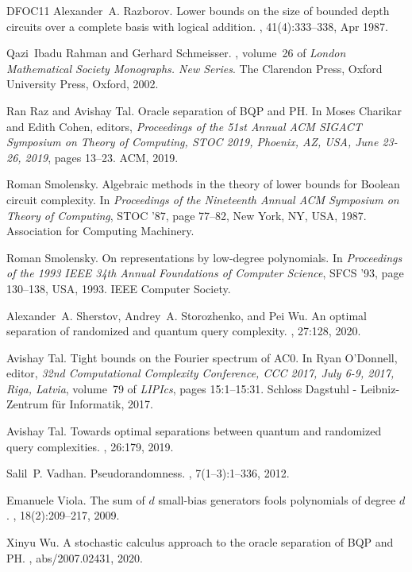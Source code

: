 \documentclass[10pt,a4paper]{article}
\theoremstyle{definition}
\begin{document}
\begin{thebibliography}{DFOC{\etalchar{+}}11}
Alexander~A. Razborov.
\newblock Lower bounds on the size of bounded depth circuits over a complete
  basis with logical addition.
,
  41(4):333--338, Apr 1987.

Qazi~Ibadu Rahman and Gerhard Schmeisser.
, volume~26 of {\em London
  Mathematical Society Monographs. New Series}.
\newblock The Clarendon Press, Oxford University Press, Oxford, 2002.

Ran Raz and Avishay Tal.
\newblock Oracle separation of {BQP} and {PH}.
\newblock In Moses Charikar and Edith Cohen, editors, {\em Proceedings of the
  51st Annual {ACM} {SIGACT} Symposium on Theory of Computing, {STOC} 2019,
  Phoenix, AZ, USA, June 23-26, 2019}, pages 13--23. {ACM}, 2019.

Roman Smolensky.
\newblock Algebraic methods in the theory of lower bounds for {B}oolean circuit
  complexity.
\newblock In {\em Proceedings of the Nineteenth Annual ACM Symposium on Theory
  of Computing}, STOC ’87, page 77–82, New York, NY, USA, 1987. Association
  for Computing Machinery.

Roman Smolensky.
\newblock On representations by low-degree polynomials.
\newblock In {\em Proceedings of the 1993 IEEE 34th Annual Foundations of
  Computer Science}, SFCS ’93, page 130–138, USA, 1993. IEEE Computer
  Society.

Alexander~A. Sherstov, Andrey~A. Storozhenko, and Pei Wu.
\newblock An optimal separation of randomized and quantum query complexity.
, 27:128, 2020.

Avishay Tal.
\newblock Tight bounds on the {F}ourier spectrum of {AC0}.
\newblock In Ryan O'Donnell, editor, {\em 32nd Computational Complexity
  Conference, {CCC} 2017, July 6-9, 2017, Riga, Latvia}, volume~79 of {\em
  LIPIcs}, pages 15:1--15:31. Schloss Dagstuhl - Leibniz-Zentrum f{\"{u}}r
  Informatik, 2017.

Avishay Tal.
\newblock Towards optimal separations between quantum and randomized query
  complexities.
, 26:179, 2019.

Salil~P. Vadhan.
\newblock Pseudorandomness.
,
  7(1--3):1--336, 2012.

Emanuele Viola.
\newblock The sum of $d$ small-bias generators fools polynomials of degree $d$.
, 18(2):209--217, 2009.

Xinyu Wu.
\newblock A stochastic calculus approach to the oracle separation of {BQP} and
  {PH}.
, abs/2007.02431, 2020.

\end{thebibliography}
\end{document}

